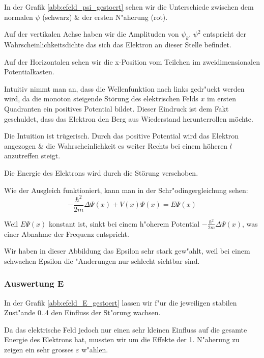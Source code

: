 \begin{refsection}
In der Grafik \ref{abb:efeld_psi_gestoert} sehen wir die Unterschiede zwischen dem normalen $\psi$ (schwarz) \& der ersten N"aherung (rot).

Auf der vertikalen Achse haben wir die Amplituden von $\psi_k$.
$\psi^2$ entspricht der Wahrscheinlichkeitsdichte das sich das Elektron an dieser Stelle befindet.

Auf der Horizontalen sehen wir die x-Position vom Teilchen im zweidimensionalen Potentialkasten.

Intuitiv nimmt man an, dass die Wellenfunktion nach links gedr"uckt werden wird, da die monoton steigende St\"orung
des elektrischen Felds $x$ im ersten Quadranten ein positives Potential bildet.
Dieser Eindruck ist dem Fakt geschuldet, dass das Elektron den Berg aus Wiederstand herunterrollen m\"ochte.

Die Intuition ist tr\"ugerisch. Durch das positive Potential wird das Elektron angezogen \& die
Wahrscheinlichkeit es weiter Rechts bei einem h\"oheren $l$ anzutreffen steigt.

Die Energie des Elektrons wird durch die St\"orung verschoben.

Wie der Ausgleich funktioniert, kann man in der Schr"odingergleichung sehen:
\[
-\frac{\hbar^2}{2m}\Delta\Psi(x) + V(x)\Psi(x)
=
E \Psi(x)
\]

Weil $E \Psi(x)$ konstant ist, sinkt bei einem h"oherem Potential $-\frac{\hbar^2}{2m}\Delta\Psi(x)$,
was einer Abnahme der Frequenz entspricht.

Wir haben in dieser Abbildung das Epsilon sehr stark gew"ahlt,
weil bei einem schwachen Epsilon die "Anderungen nur schlecht sichtbar sind.



\subsubsection{Auswertung E}

In der Grafik \ref{abb:efeld_E_gestoert} lassen wir f"ur die jeweiligen stabilen Zust"ande 0..4 
den Einfluss der St"orung wachsen.

Da das elektrische Feld jedoch nur einen sehr kleinen Einfluss auf die gesamte Energie des 
Elektrons hat, mussten wir um die Effekte der 1. N"aherung zu zeigen ein sehr grosses $\varepsilon$
w"ahlen.


\end{refsection}

